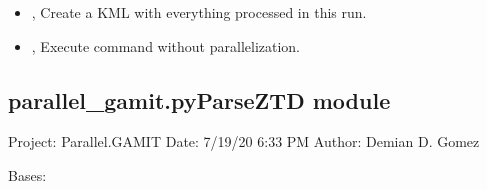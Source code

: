 \documentclass[letterpaper,10pt,english]{sphinxmanual}
\begin{document}
\begin{itemize}
\item {} 
\sphinxAtStartPar
{\hyperref[\detokenize{parallel_gamit:pyParallelGamit.py--kml}]{}}, {\hyperref[\detokenize{parallel_gamit:pyParallelGamit.py---create_kml}]{}} \sphinxhyphen{} Create a KML with everything processed in this run.

\item {} 
\sphinxAtStartPar
{\hyperref[\detokenize{parallel_gamit:pyParallelGamit.py--np}]{}}, {\hyperref[\detokenize{parallel_gamit:pyParallelGamit.py---noparallel}]{}} \sphinxhyphen{} Execute command without parallelization.

\end{itemize}


\subsection{parallel\_gamit.pyParseZTD module}
\label{\detokenize{parallel_gamit:module-parallel_gamit.pyParseZTD}}\label{\detokenize{parallel_gamit:parallel-gamit-pyparseztd-module}}
\sphinxAtStartPar
Project: Parallel.GAMIT
Date: 7/19/20 6:33 PM
Author: Demian D. Gomez

\begin{fulllineitems}
\label{\detokenize{parallel_gamit:parallel_gamit.pyParseZTD.ParseZtdTask}}
\pysigstartsignatures
{}
\pysigstopsignatures
\sphinxAtStartPar
Bases: 

\begin{fulllineitems}
\label{\detokenize{parallel_gamit:parallel_gamit.pyParseZTD.ParseZtdTask.execute}}
\pysigstartsignatures
{}
\pysigstopsignatures
\end{fulllineitems}


\end{fulllineitems}
\end{document}
